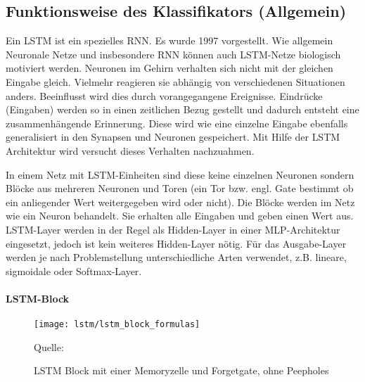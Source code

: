 \subsection{Funktionsweise des Klassifikators (Allgemein)}
\label{sec:lstm_allg}
Ein \acl{LSTM} ist ein spezielles \ac{RNN}. Es wurde 1997
vorgestellt\cite{Hochreiter:1997}. Wie allgemein Neuronale Netze und
insbesondere \ac{RNN} können auch \ac{LSTM}-Netze biologisch motiviert werden.
Neuronen im Gehirn verhalten sich nicht mit der gleichen Eingabe gleich.
Vielmehr reagieren sie abhängig von verschiedenen Situationen anders. Beeinflusst
wird dies durch vorangegangene Ereignisse. Eindrücke (Eingaben) werden so in
einen zeitlichen Bezug gestellt und dadurch entsteht eine zusammenhängende
Erinnerung. Diese wird wie eine einzelne Eingabe ebenfalls generalisiert in den
Synapsen und Neuronen gespeichert. Mit Hilfe der \ac{LSTM} Architektur wird
versucht dieses Verhalten nachzuahmen.

In einem Netz mit \ac{LSTM}-Einheiten sind diese keine einzelnen Neuronen
sondern Blöcke aus mehreren Neuronen und Toren (ein Tor bzw. engl.
Gate bestimmt ob ein anliegender Wert weitergegeben wird oder nicht).
Die Blöcke werden im Netz wie ein Neuron behandelt. Sie erhalten alle Eingaben
und geben einen Wert aus. \ac{LSTM}-Layer werden in der Regel als Hidden-Layer
in einer \ac{MLP}-Architektur eingesetzt, jedoch ist kein weiteres Hidden-Layer
nötig. Für das Ausgabe-Layer werden je nach Problemstellung unterschiedliche
Arten verwendet, z.B. lineare, sigmoidale oder Softmax-Layer.

\paragraph{\ac{LSTM}-Block}

\begin{figure*}[htfp]
	\begin{center}
	\texttt{[image: lstm/lstm\_block\_formulas]}
	\caption[\acs{LSTM} Block]{\acs{LSTM} Block mit einer Memoryzelle und Forgetgate,  ohne
	Peepholes} \tiny Quelle: \cite{Gers2002b}
	\label{fig:lstm_block}
	\end{center}
\end{figure*}  

